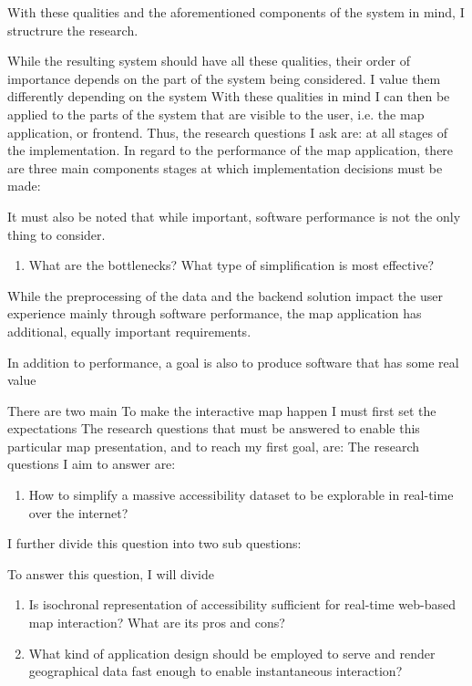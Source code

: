 With these qualities and the aforementioned components of the system in mind,
I structrure the research.

While the resulting system should have all these qualities,
their order of importance depends on the part of the system being considered.
I value them differently depending on the  system With these qualities in mind I can then be applied to 
the parts of the system
that are visible to the user, i.e. the map application, or frontend.
Thus, the research questions I ask are:
at all stages of the implementation.
In regard to the performance of the map application,
there are three main components stages at which implementation decisions must be made:  %

It must also be noted that while important,
software performance is not the only thing to consider.

\begin{enumerate}
	\item What are the bottlenecks? What type of simplification is most effective? 
\end{enumerate}

While the preprocessing of the data and the backend solution
impact the user experience mainly through software performance,
the map application has additional, equally important requirements.

In addition to performance,
a goal is also to produce software that has some real value

  There are two main  To make the interactive map happen I must first set the expectations
The research questions that must be answered to
enable this particular map presentation,
and to reach my first goal, are:
The research questions I aim to answer are:
\begin{enumerate}
	\item How to simplify a massive accessibility dataset to be explorable in real-time over the internet?
\end{enumerate}

I further divide this question into two sub questions:


To answer this question, I will divide
\begin{enumerate}
	\item Is isochronal representation of accessibility sufficient for real-time web-based map interaction? What are its pros and cons?
	\item What kind of application design should be employed to serve and render geographical data fast enough to enable instantaneous interaction?
\end{enumerate}

